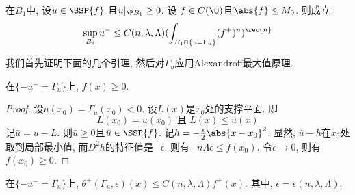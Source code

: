 \begin{theorem}\label{vis_abp}
    在$B_1$中, 设$u \in \SSP{f}$ 且$u|_{\P B_1} \ge 0$.  设 $f \in C(\O)$且$\abs{f} \le M_0$.  则成立
    \begin{equation}
        \sup_{B_1} u^- \le C(n, \lambda, \Lambda)(\int_{B_1 \cap \{u=\Gamma_u\}}(f^+)^n)^\rec{n}
    \end{equation}
\end{theorem}
我们首先证明下面的几个引理, 然后对$\Gamma_u$应用Alexandroff最大值原理.  
\begin{lemma}\label{vis_abp_l1}
    在$\{-u^-=\Gamma_u\}$上, $f(x) \ge 0$.  
\end{lemma}
\begin{proof}
    设$u(x_0)=\Gamma_u(x_0) <0$.  设$L(x)$是$x_0$处的支撑平面.  即
    \begin{equation}
        L(x_0)=u(x_0)\text{ 且 }L(x) \le u(x)
    \end{equation}
    记$\bar{u}=u-L$.  则$\bar{u} \ge 0$且$\bar{u} \in \SSP{f}$.  记$h=-\frac{\epsilon}{2}\abs{x-x_0}^2$.  显然, $\bar{u}-h$在$x_0$处取到局部最小值, 而$D^2h$的特征值是$-\epsilon$.  则有$-n\Lambda \epsilon \le f(x_0)$.  令$\epsilon \to 0$, 则有$f(x_0) \ge 0$.  
\end{proof}
\begin{lemma} \label{vis_abp_l2}
    在$\{-u^-=\Gamma_u\}$上, $\theta^+(\Gamma_u, \epsilon)(x) \le C(n,\lambda,\Lambda)f^+(x)$.  其中, $\epsilon  =\epsilon(n,\lambda,\Lambda)$.
\end{lemma}
